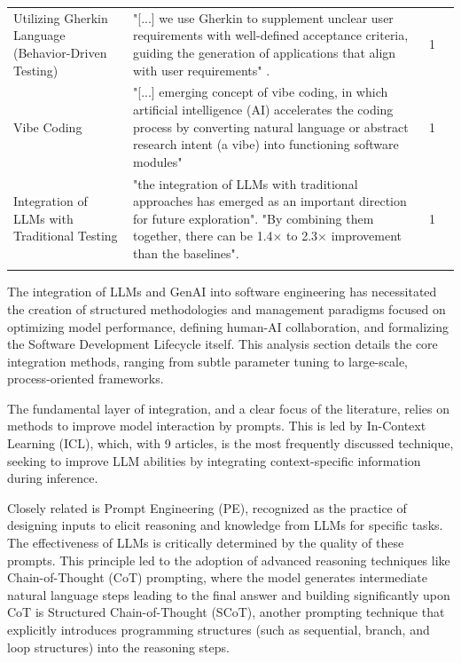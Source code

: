 {\begin{longtable}{>{\raggedright\arraybackslash} p{3cm} p{9.3cm} p{0.2cm} p{1.8cm}}
Utilizing Gherkin Language (Behavior-Driven Testing) & "[...] we use Gherkin to supplement unclear user requirements with well-defined acceptance criteria, guiding the generation of applications that align with user requirements" \cite{Zhang:2025ea}. & 1 & \cite{Zhang:2025ea} \\ \addlinespace

Vibe Coding & "[...] emerging concept of vibe coding, in which artificial intelligence (AI) accelerates the coding process by converting natural language or abstract research intent (a vibe) into functioning software modules" \cite{Moore:2025vc} & 1 & \cite{Moore:2025vc} \\ \addlinespace

Integration of LLMs with Traditional Testing & "the integration of LLMs with traditional approaches has emerged as an important direction for future exploration". "By combining them together, there can be 1.4× to 2.3× improvement than the baselines". \cite{Wang:2025rs} & 1 & \cite{Wang:2025rs} \\ \addlinespace

\end{longtable}
}

The integration of LLMs and GenAI into software engineering has necessitated the creation of structured methodologies and management paradigms focused on optimizing model performance, defining human-AI collaboration, and formalizing the Software Development Lifecycle itself. This analysis section details the core integration methods, ranging from subtle parameter tuning to large-scale, process-oriented frameworks.

The fundamental layer of integration, and a clear focus of the literature, relies on methods to improve model interaction by prompts. This is led by In-Context Learning (ICL), which, with 9 articles, is the most frequently discussed technique, seeking to improve LLM abilities by integrating context-specific information during inference. 

Closely related is Prompt Engineering (PE), recognized as the practice of designing inputs to elicit reasoning and knowledge from LLMs for specific tasks. The effectiveness of LLMs is critically determined by the quality of these prompts. This principle led to the adoption of advanced reasoning techniques like Chain-of-Thought (CoT) prompting, where the model generates intermediate natural language steps leading to the final answer and building significantly upon CoT is Structured Chain-of-Thought (SCoT), another prompting technique that explicitly introduces programming structures (such as sequential, branch, and loop structures) into the reasoning steps. \cite{Li:2025sc}

